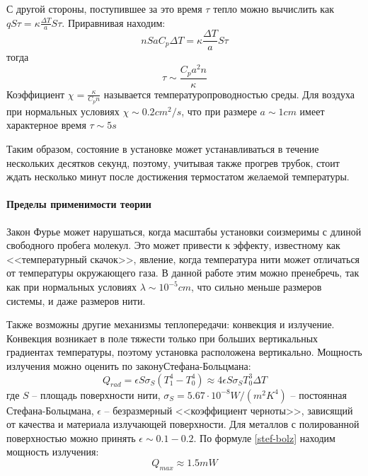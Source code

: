 \documentclass[a4paper,12pt]{report}
\begin{document}
    С другой стороны, поступившее за это время $\tau$ тепло можно вычислить как $qS\tau=\kappa\frac{\Delta T}{a}S\tau$. Приравнивая находим:
    \begin{equation*}
        nSaC_p\Delta T=\kappa\frac{\Delta T}{a}S\tau
    \end{equation*}
    тогда
    \begin{equation}
        \label{tau}
        \tau\sim\frac{C_pa^2n}{\kappa}
    \end{equation}
    Коэффициент $\chi=\frac{\kappa}{C_pn}$ называется температуропроводностью среды. Для воздуха при нормальных условиях $\chi\sim 0.2cm^2/s$, что при размере $a\sim 1cm$ имеет характерное время $\tau\sim 5s$

    Таким образом, состояние в установке может устанавливаться в течение нескольких десятков секунд, поэтому, учитывая также прогрев трубок, стоит ждать несколько минут после достижения термостатом желаемой температуры.

    \paragraph*{Пределы применимости теории} Закон Фурье может нарушаться, когда масштабы установки соизмеримы с длиной свободного пробега молекул. Это может привести к эффекту, известному как <<температурный скачок>>, явление, когда температура нити может отличаться от температуры окружающего газа. В данной работе этим можно пренебречь, так как при нормальных условиях $\lambda\sim 10^{-5}cm$, что сильно меньше размеров системы, и даже размеров нити.

    Также возможны другие механизмы теплопередачи: конвекция и излучение. Конвекция возникает в поле тяжести только при больших вертикальных градиентах температуры, поэтому установка расположена вертикально. Мощность излучения можно оценить по закону\newline Стефана-Больцмана:
    \begin{equation}
        \label{stef-bolz}
        Q_{rad}=\epsilon S \sigma_S(T_1^4-T_0^4)\approx 4\epsilon S\sigma_ST_0^3\Delta T
    \end{equation}
    где $S$ -- площадь поверхности нити, $\sigma_S=5.67\cdot 10^{-8}W/(m^2K^4)$ -- постоянная Стефана-Больцмана, $\epsilon$ -- безразмерный <<коэффициент черноты>>, зависящий от качества и материала излучающей поверхности. Для металлов с полированной поверхностью можно принять $\epsilon\sim 0.1-0.2$. По формуле \eqref{stef-bolz} находим мощность излучения:
    \begin{equation*}
        Q_{max} \approx 1.5mW
    \end{equation*}
\end{document}
